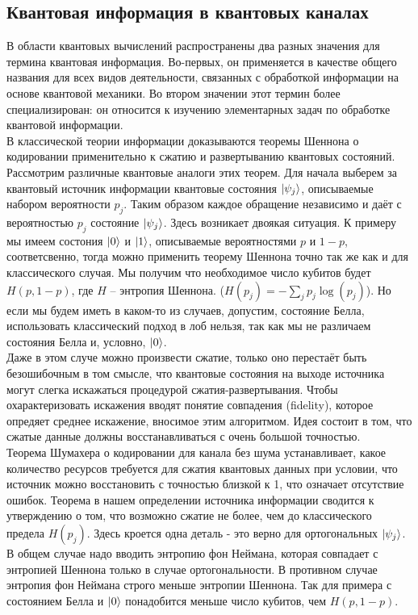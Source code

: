 \documentclass[12pt,a4paper]{article}
\begin{document}
		\subsection{Квантовая информация в квантовых каналах}
		В области квантовых вычислений распространены два разных значения для термина квантовая информация. Во-первых, он применяется в качестве общего названия для всех видов деятельности, связанных с обработкой информации на основе квантовой механики. Во втором значении этот термин более специализирован: он относится к изучению элементарных задач по обработке квантовой информации\cite{1}.\\
		\indent В классической теории информации доказываются теоремы Шеннона о кодировании применительно к сжатию и развертыванию квантовых состояний. Рассмотрим различные квантовые аналоги этих теорем. Для начала выберем за квантовый источник информации квантовые состояния $\ket{\psi_{j}}$, описываемые набором вероятности $p_{j}$. Таким образом каждое обращение независимо и даёт с вероятностью $p_{j}$ состояние  $\ket{\psi_{j}}$. Здесь возникает двоякая ситуация. К примеру мы имеем состония $\ket{0}$ и $\ket{1}$, описываемые вероятностями $p$ и $1-p$, соответсвенно, тогда можно применить теорему Шеннона точно так же как и для классического случая. Мы получим что необходимое число кубитов будет $H(p,1-p)$, где $H$ -- энтропия Шеннона. ($H(p_{j})=-\sum_{j}p_{j}\log(p_{j})$). Но если мы будем иметь в каком-то из случаев, допустим, состояние Белла, использовать классический подход в лоб нельзя, так как мы не различаем состояния Белла и, условно,  $\ket{0}$. \\
		\indent Даже в этом случе можно произвести сжатие, только оно перестаёт быть безошибочным в том смысле, что квантовые состояния на выходе источника могут слегка искажаться процедурой сжатия-развертывания. Чтобы охарактеризовать искажения вводят понятие совпадения (fidelity), которое опредяет среднее искажение, вносимое этим алгоритмом. Идея состоит в том, что сжатые данные должны восстанавливаться с очень большой точностью.\\
		\indent Теорема Шумахера о кодировании для канала без шума устанавливает, какое количество ресурсов требуется для сжатия квантовых данных при условии, что источник можно восстановить с точностью близкой к 1, что означает отсутствие ошибок. Теорема в нашем определении источника информации сводится к утверждению о том, что возможно сжатие не более, чем до классического предела $H(p_{j})$. Здесь кроется одна деталь - это верно для ортогональных  $\ket{\psi_{j}}$. В общем случае надо вводить энтропию фон Неймана, которая совпадает с энтропией Шеннона только в случае ортогональности. В противном случае энтропия фон Неймана строго меньше энтропии Шеннона. Так для примера с состоянием Белла и $\ket{0}$ понадобится меньше число кубитов, чем  $H(p,1-p)$.
\end{document}
